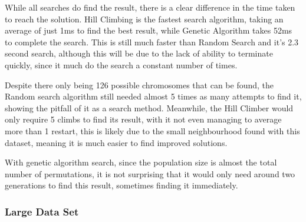 \documentclass[11pt, a4paper]{article}
\begin{document}
While all searches do find the result, there is a clear difference in the time
taken to reach the solution. Hill Climbing is the fastest search algorithm,
taking an average of just 1ms to find the best result, while Genetic Algorithm
takes 52ms to complete the search. This is still much faster than Random Search
and it's 2.3 second search, although this will be due to the lack of ability to
terminate quickly, since it much do the search a constant number of times.

Despite there only being 126 possible chromosomes that can be found, the
Random search algorithm still needed almost 5 times as many attempts to find it,
showing the pitfall of it as a search method. Meanwhile, the Hill Climber would
only require 5 climbs to find its result, with it not even managing to average
more than 1 restart, this is likely due to the small neighbourhood found with
this dataset, meaning it is much easier to find improved solutions.

With genetic algorithm search, since the population size is almost the total
number of permutations, it is not surprising that it would only need around two
generations to find this result, sometimes finding it immediately.

\subsubsection{Large Data Set} %
\label{ssub:large_data_set}



 
\end{document}
